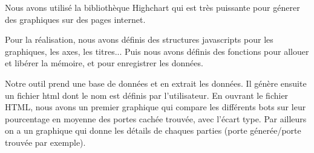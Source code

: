Nous avons utilisé la bibliothèque Highchart qui est très puissante pour génerer des graphiques sur des pages internet. 

Pour la réalisation, nous avons définis des structures javascripts pour les graphiques, les axes, les titres... Puis nous avons définis des fonctions pour allouer et libérer la mémoire, et pour enregistrer les données. 

Notre outil prend une base de données et en extrait les données. Il génère ensuite un fichier html dont le nom est définis par l'utilisateur.
En ouvrant le fichier HTML, nous avons un premier graphique qui compare les différents bots sur leur pourcentage en moyenne des portes cachée trouvée, avec l'écart type. Par ailleurs on a un graphique qui donne les détails de chaques parties (porte génerée/porte trouvée par exemple).
